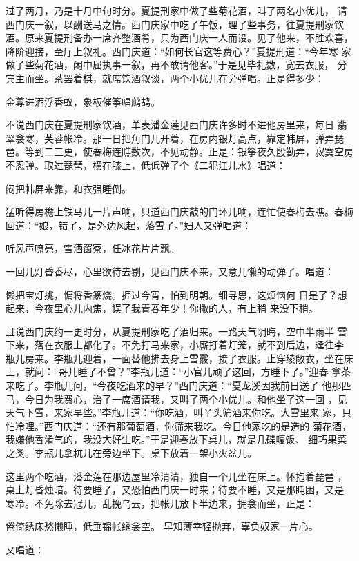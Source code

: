 过了两月，乃是十月中旬时分。夏提刑家中做了些菊花酒，叫了两名小优儿，
请西门庆一叙，以酬送马之情。西门庆家中吃了午饭，理了些事务，往夏提刑家饮
酒。原来夏提刑备办一席齐整酒肴，只为西门庆一人而设。见了他来，不胜欢喜，
降阶迎接，至厅上叙礼。西门庆道：“如何长官这等费心？”夏提刑道：“今年寒
家做了些菊花酒，闲中屈执事一叙，再不敢请他客。”于是见毕礼数，宽去衣服，
分宾主而坐。茶罢着棋，就席饮酒叙谈，两个小优儿在旁弹唱。正是得多少：

金尊进酒浮香蚁，象板催筝唱鹧鸪。

不说西门庆在夏提刑家饮酒，单表潘金莲见西门庆许多时不进他房里来，每日
翡翠衾寒，芙蓉帐冷。那一日把角门儿开着，在房内银灯高点，靠定帏屏，弹弄琵
琶。等到二三更，使春梅连瞧数次，不见动静。正是：银筝夜久殷勤弄，寂寞空房
不忍弹。取过琵琶，横在膝上，低低弹了个《二犯江儿水》唱道：

闷把帏屏来靠，和衣强睡倒。

猛听得房檐上铁马儿一片声响，只道西门庆敲的门环儿响，连忙使春梅去瞧。春梅
回道：“娘，错了，是外边风起，落雪了。”妇人又弹唱道：

听风声嘹亮，雪洒窗寮，任冰花片片飘。

一回儿灯昏香尽，心里欲待去剔，见西门庆不来，又意儿懒的动弹了。唱道：

懒把宝灯挑，慵将香篆烧。捱过今宵，怕到明朝。细寻思，这烦恼何
日是了？想起来，今夜里心儿内焦，误了我青春年少！你撇的人，有上稍
来没下稍。

且说西门庆约一更时分，从夏提刑家吃了酒归来。一路天气阴晦，空中半雨半
雪下来，落在衣服上都化了。不免打马来家，小厮打着灯笼，就不到后边，迳往李
瓶儿房来。李瓶儿迎着，一面替他拂去身上雪霰，接了衣服。止穿绫敞衣，坐在床
上，就问：“哥儿睡了不曾？”李瓶儿道：“小官儿顽了这回，方睡下了。”迎春
拿茶来吃了。李瓶儿问，“今夜吃酒来的早？”西门庆道：“夏龙溪因我前日送了
他那匹马，今日为我费心，治了一席酒请我，又叫了两个小优儿。和他坐了这一回
，见天气下雪，来家早些。”李瓶儿道：“你吃酒，叫丫头筛酒来你吃。大雪里来
家，只怕冷哩。”西门庆道：“还有那葡萄酒，你筛来我吃。今日他家吃的是造的
菊花酒，我嫌他香淆气的，我没大好生吃。”于是迎春放下桌儿，就是几碟嗄饭、
细巧果菜之类。李瓶儿拿杌儿在旁边坐下。桌下放着一架小火盆儿。

这里两个吃酒，潘金莲在那边屋里冷清清，独自一个儿坐在床上。怀抱着琵琶
，桌上灯昏烛暗。待要睡了，又恐怕西门庆一时来；待要不睡，又是那盹困，又是
寒冷。不免除去冠儿，乱挽乌云，把帐儿放下半边来，拥衾而坐，正是：

倦倚绣床愁懒睡，低垂锦帐绣衾空。
早知薄幸轻抛弃，辜负奴家一片心。

又唱道：

